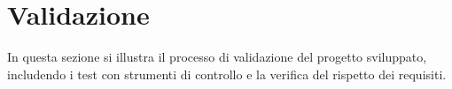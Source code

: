 \section{Validazione}
In questa sezione si illustra il processo di validazione del progetto sviluppato, includendo i test con strumenti di controllo e la verifica del rispetto dei requisiti.